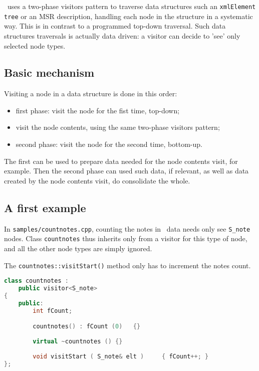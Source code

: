 \lib\ uses a two-phase visitors pattern to traverse data structures such an {\tt xmlElement tree} or an MSR description, handling each node in the structure in a systematic way. This is in contrast to a programmed top-down traversal.
Such data structures traversals is actually data driven: a visitor can decide to 'see' only selected node types.

\subsection{Basic mechanism}

Visiting a node in a data structure is done in this order:
\begin{itemize}
\item first phase: visit the node for the fist time, top-down;
\item visit the node contents, using the same two-phase visitors pattern;
\item second phase: visit the node for the second time, bottom-up.
\end{itemize}

The first can be used to prepare data needed for the node contents visit, for example.
Then the second phase can used such data, if relevant, as well as data created by the node contents visit, do consolidate the whole.

\subsection{A first example}

In {\tt samples/countnotes.cpp}, counting the notes in \mxml\ data needs only see {\tt S_note} nodes. Class {\tt countnotes} thus inherits only from a visitor for this type of node, and all the other node types are simply ignored.

The {\tt countnotes::visitStart()} method only has to increment the notes count.

\begin{lstlisting}[language=C++,caption={{\tt samples/countnotes.cpp}}]
class countnotes : 
	public visitor<S_note>
{
	public:
		int	fCount;

		countnotes() : fCount (0)	{}
				 
		virtual ~countnotes () {}
		
		void visitStart ( S_note& elt )		{ fCount++; }
};
\end{lstlisting}

